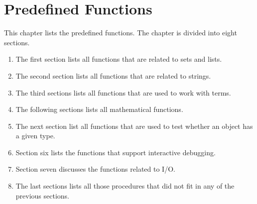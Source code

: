 \chapter{Predefined Functions}
This chapter lists  the predefined functions.  The chapter is divided into eight
sections.
\begin{enumerate}
\item The first section lists all functions that are related to sets and lists.
\item The second section lists all functions that are related to strings.
\item The third sections lists all functions that are used to work with terms.
\item The following sections lists all mathematical functions.
\item The next section list all functions that are used to test whether an object has a
      given type.
\item Section six lists the functions that support interactive debugging.
\item Section seven discusses the functions related to I/O.
\item The last sections lists all those procedures that did not fit in 
      any of the previous sections.  
\end{enumerate}

